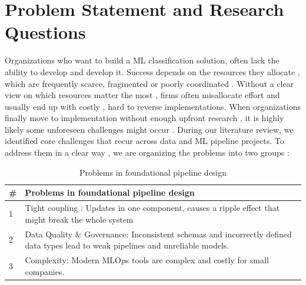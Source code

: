 \section{Problem Statement and Research Questions}
Organizations who want to build a ML classification solution, often lack the ability to develop and develop it. Success depends on the resources they allocate , which are frequently scarce, fragmented or poorly coordinated \cite{duda:2024}. Without a clear view on which resources matter the most , firms often misallocate effort and usually end up with costly , hard to reverse implementations.
When organizations finally move to implementation without enough upfront research , it is highly likely some unforeseen challenges might occur \cite{arpteg:2018}. During our literature review, we identified core challenges that recur across data and ML pipeline projects. To address them in a clear way , we are organizing the problems into two groups :

\begin{table}[htbp]
    \centering
    \begin{tabularx}{\linewidth}{@{}lX@{}}
        \toprule
        \textbf{\#} & \textbf{Problems in foundational pipeline design}                                                                                                   \\
        \midrule
        1           & Tight coupling : Updates in one component, causes a ripple effect that might break the whole system \cite{modi:2023}                                \\
        2           & Data Quality \& Governance: Inconsistent schemas and incorrectly defined data types lead to weak pipelines and unreliable models. \cite{foidl:2024} \\
        3           & Complexity: Modern MLOps tools are complex and costly for small companies. \cite{eken:2025}                                                         \\
        \bottomrule
    \end{tabularx}
    \caption{Problems in foundational pipeline design}
    \label{tab:problems_foundational}
\end{table}

